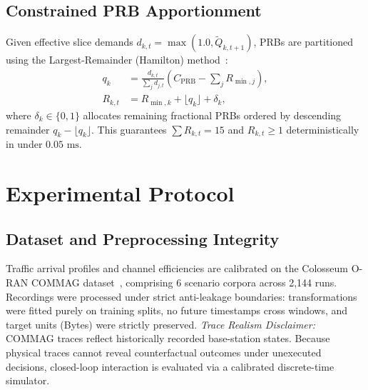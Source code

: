 \documentclass[conference]{IEEEtran}
\begin{document}
\subsection{Constrained PRB Apportionment}
Given effective slice demands $d_{k, t} = \max\left(1.0, \tilde{Q}_{k, t+1}\right)$, PRBs are partitioned using the Largest-Remainder (Hamilton) method~\cite{balinski1982fair}:
\begin{align}
q_k &= \frac{d_{k, t}}{\sum_j d_{j, t}} \left(C_{\text{PRB}} - \sum_j R_{\min, j}\right), \\
R_{k, t} &= R_{\min, k} + \lfloor q_k \rfloor + \delta_k,
\end{align}
where $\delta_k \in \{0, 1\}$ allocates remaining fractional PRBs ordered by descending remainder $q_k - \lfloor q_k \rfloor$. This guarantees $\sum R_{k, t} = 15$ and $R_{k, t} \ge 1$ deterministically in under $0.05\text{ ms}$.

\section{Experimental Protocol}
\subsection{Dataset and Preprocessing Integrity}
Traffic arrival profiles and channel efficiencies are calibrated on the Colosseum O-RAN COMMAG dataset~\cite{bonati2021intelligence}, comprising 6 scenario corpora across 2,144 runs. Recordings were processed under strict anti-leakage boundaries: transformations were fitted purely on training splits, no future timestamps cross windows, and target units (Bytes) were strictly preserved.
\textit{Trace Realism Disclaimer:} COMMAG traces reflect historically recorded base-station states. Because physical traces cannot reveal counterfactual outcomes under unexecuted decisions, closed-loop interaction is evaluated via a calibrated discrete-time simulator.
\end{document}
